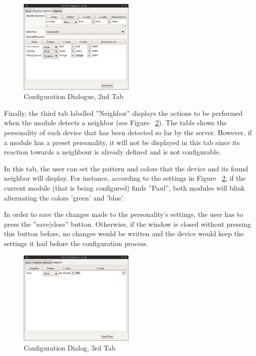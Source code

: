 \begin{figure}[h!]
 \centering
 \includegraphics[width= 0.5\textwidth, clip=true  ,keepaspectratio=true]{./pic/java-server-config02.png}
 \caption{Configuration Dialogue, 2nd Tab}
 \label{fig:java-server-config02}
\end{figure}


Finally, the third tab labelled ''Neighbor'' displays the actions to be performed when the module detects a neighbor (see Figure ~\ref{fig:java-server-config03}). The table shows the personality of each device that has been detected so far by the server. However, if a module has a preset personality, it will not be displayed in this tab since its reaction towards a neighbour is already defined and is not configurable. 

In this tab, the user can set the pattern and colors that the device and its found neighbor will display. For instance, according to the settings in Figure ~\ref{fig:java-server-config03}, if the current module (that is being configured) finds ''Paul'', both modules will blink alternating the colors 'green' and 'blue'. 

In order to save the changes made to the personality's settings, the user has to press the ''save|close'' button. Otherwise, if the window is closed without pressing this button before, no changes would be written and the device would keep the settings it had before the configuration process.

\begin{figure}[h!]
 \centering
 \includegraphics[width= 0.5\textwidth, clip=true  ,keepaspectratio=true]{./pic/java-server-config03.png}
 \caption{Configuration Dialog, 3rd Tab}
 \label{fig:java-server-config03}
\end{figure}

